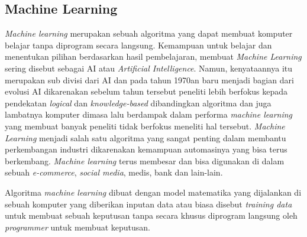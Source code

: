 \subsection{Machine Learning} \label{II.Dasar Teori}
\textit{Machine learning} merupakan sebuah algoritma yang dapat membuat komputer belajar tanpa diprogram secara langsung\cite{alpaydin2021machine}. Kemampuan untuk belajar dan menentukan pilihan berdasarkan hasil pembelajaran, membuat \textit{Machine Learning} sering disebut sebagai AI atau \textit{Artificial Intelligence}. Namun, kenyataannya itu merupakan sub divisi dari AI dan pada tahun 1970an baru menjadi bagian dari evolusi AI dikarenakan sebelum tahun tersebut peneliti lebih berfokus kepada pendekatan \textit{logical} dan \textit{knowledge-based} dibandingkan algoritma dan juga lambatnya komputer dimasa lalu berdampak dalam performa \textit{machine learning} yang membuat banyak peneliti tidak berfokus meneliti hal tersebut\cite{fradkov2020early}. \textit{Machine Learning} menjadi salah satu algoritma yang sangat penting dalam membantu perkembangan industri dikarenakan kemampuan automasinya yang bisa terus berkembang\cite{jordan2015machine}. \textit{Machine learning} terus membesar dan bisa digunakan di dalam sebuah \textit{e-commerce}, \textit{social media}, medis, bank dan lain-lain\cite{jordan2015machine}.

Algoritma \textit{machine learning} dibuat dengan model matematika yang dijalankan di sebuah komputer yang diberikan inputan data atau biasa disebut \textit{training data} untuk membuat sebuah keputusan tanpa secara khusus diprogram langsung oleh \textit{programmer} untuk membuat keputusan\cite{alpaydin2021machine}.

